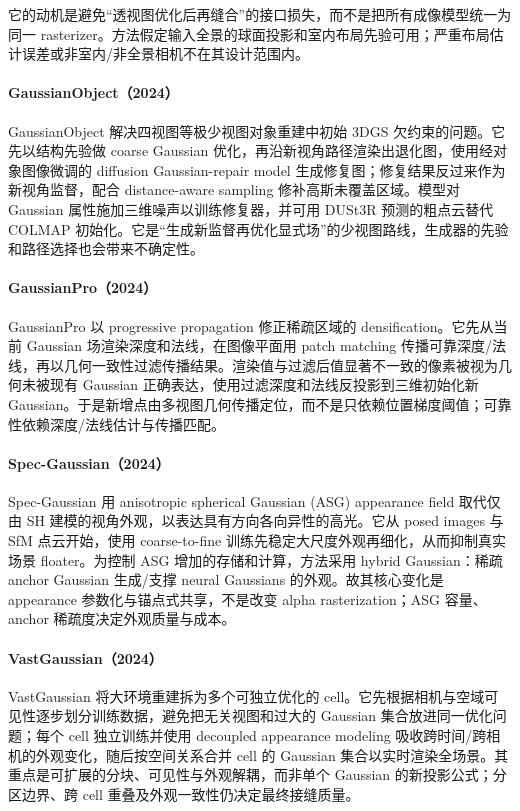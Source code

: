 它的动机是避免“透视图优化后再缝合”的接口损失，而不是把所有成像模型统一为同一 rasterizer。方法假定输入全景的球面投影和室内布局先验可用；严重布局估计误差或非室内/非全景相机不在其设计范围内。


\paragraph{GaussianObject（2024）\cite{2402_10259}}
GaussianObject 解决四视图等极少视图对象重建中初始 3DGS 欠约束的问题。它先以结构先验做 coarse Gaussian 优化，再沿新视角路径渲染出退化图，使用经对象图像微调的 diffusion Gaussian-repair model 生成修复图；修复结果反过来作为新视角监督，配合 distance-aware sampling 修补高斯未覆盖区域。模型对 Gaussian 属性施加三维噪声以训练修复器，并可用 DUSt3R 预测的粗点云替代 COLMAP 初始化。它是“生成新监督再优化显式场”的少视图路线，生成器的先验和路径选择也会带来不确定性。

\paragraph{GaussianPro（2024）\cite{2402_14650}}
GaussianPro 以 progressive propagation 修正稀疏区域的 densification。它先从当前 Gaussian 场渲染深度和法线，在图像平面用 patch matching 传播可靠深度/法线，再以几何一致性过滤传播结果。渲染值与过滤后值显著不一致的像素被视为几何未被现有 Gaussian 正确表达，使用过滤深度和法线反投影到三维初始化新 Gaussian。于是新增点由多视图几何传播定位，而不是只依赖位置梯度阈值；可靠性依赖深度/法线估计与传播匹配。

\paragraph{Spec-Gaussian（2024）\cite{2402_15870}}
Spec-Gaussian 用 anisotropic spherical Gaussian (ASG) appearance field 取代仅由 SH 建模的视角外观，以表达具有方向各向异性的高光。它从 posed images 与 SfM 点云开始，使用 coarse-to-fine 训练先稳定大尺度外观再细化，从而抑制真实场景 floater。为控制 ASG 增加的存储和计算，方法采用 hybrid Gaussian：稀疏 anchor Gaussian 生成/支撑 neural Gaussians 的外观。故其核心变化是 appearance 参数化与锚点式共享，不是改变 alpha rasterization；ASG 容量、anchor 稀疏度决定外观质量与成本。

\paragraph{VastGaussian（2024）\cite{2402_17427}}
VastGaussian 将大环境重建拆为多个可独立优化的 cell。它先根据相机与空域可见性逐步划分训练数据，避免把无关视图和过大的 Gaussian 集合放进同一优化问题；每个 cell 独立训练并使用 decoupled appearance modeling 吸收跨时间/跨相机的外观变化，随后按空间关系合并 cell 的 Gaussian 集合以实时渲染全场景。其重点是可扩展的分块、可见性与外观解耦，而非单个 Gaussian 的新投影公式；分区边界、跨 cell 重叠及外观一致性仍决定最终接缝质量。

